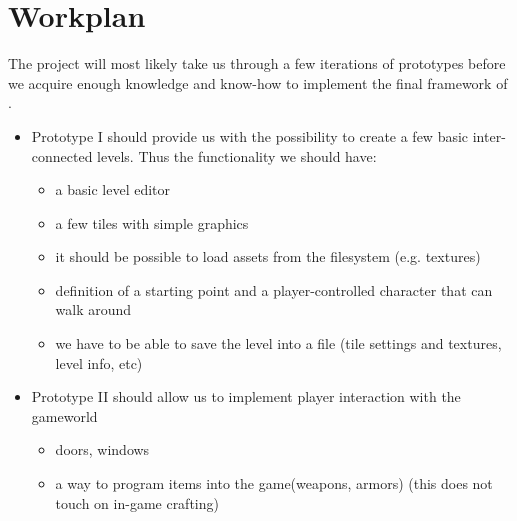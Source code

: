 \documentclass[a4paper,10pt]{book}
\begin{document}
\chapter{Workplan}
The project will most likely take us through a few iterations of prototypes before we acquire enough knowledge and know-how to implement the final framework of \Enginename{}.

\begin{itemize}
  \item \Enginename{} Prototype I should provide us with the possibility to create a few basic inter-connected levels. Thus the functionality we should have:
  \begin{itemize}
    \item a basic level editor
    \item a few tiles with simple graphics
    \item it should be possible to load assets from the filesystem (e.g. textures)
    \item definition of a starting point and a player-controlled character that can walk around
    \item we have to be able to save the level into a file (tile settings and textures, level info, etc)
  \end{itemize}
  \item \Enginename{} Prototype II should allow us to implement player interaction with the gameworld
  \begin{itemize}
    \item doors, windows
    \item a way to program items into the game(weapons, armors) (this does not touch on in-game crafting)
  \end{itemize}
\end{itemize}
\end{document}
